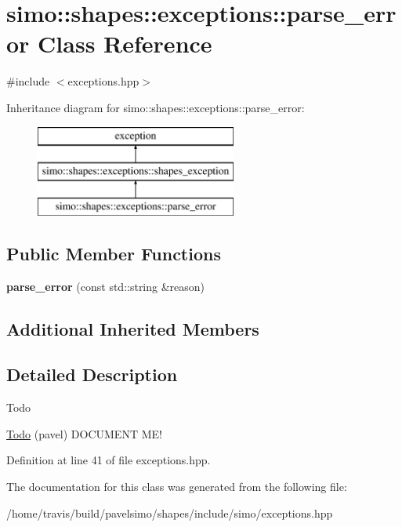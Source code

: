 \hypertarget{classsimo_1_1shapes_1_1exceptions_1_1parse__error}{\section{simo\-:\-:shapes\-:\-:exceptions\-:\-:parse\-\_\-error Class Reference}
\label{classsimo_1_1shapes_1_1exceptions_1_1parse__error}
}


{\ttfamily \#include $<$exceptions.\-hpp$>$}

Inheritance diagram for simo\-:\-:shapes\-:\-:exceptions\-:\-:parse\-\_\-error\-:\begin{figure}[H]
\begin{center}
\leavevmode
\includegraphics[height=3.000000cm]{classsimo_1_1shapes_1_1exceptions_1_1parse__error}
\end{center}
\end{figure}
\subsection*{Public Member Functions}
\begin{DoxyCompactItemize}
\item 
\hypertarget{classsimo_1_1shapes_1_1exceptions_1_1parse__error_ab17b7f0934ad6fee8a0ca1acae4ad7d5}{{\bfseries parse\-\_\-error} (const std\-::string \&reason)}\label{classsimo_1_1shapes_1_1exceptions_1_1parse__error_ab17b7f0934ad6fee8a0ca1acae4ad7d5}

\end{DoxyCompactItemize}
\subsection*{Additional Inherited Members}


\subsection{Detailed Description}
\begin{DoxyRefDesc}{Todo}
\item[\hyperlink{todo__todo000001}{Todo}](pavel) D\-O\-C\-U\-M\-E\-N\-T M\-E! \end{DoxyRefDesc}


Definition at line 41 of file exceptions.\-hpp.



The documentation for this class was generated from the following file\-:\begin{DoxyCompactItemize}
\item 
/home/travis/build/pavelsimo/shapes/include/simo/exceptions.\-hpp\end{DoxyCompactItemize}
